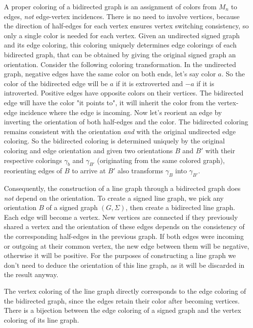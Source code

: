 A proper coloring of a bidirected graph is an assignment of colors from $M_n$ to edges, \textit{not} edge-vertex incidences. 
There is no need to involve vertices, because the direction of half-edges for each vertex ensures vertex switching consistency, so only a single color is needed for each vertex.
Given an undirected signed graph and its edge coloring, this coloring uniquely determines edge colorings of each bidirected graph, that can be obtained by giving the original signed graph an orientation.
Consider the following coloring transformation. In the undirected graph, negative edges have the same color on both ends, let's say color $a$. So the color of the bidirected edge will be $a$ if it is extroverted and $-a$ if it is introverted.
Positive edges have opposite colors on their vertices. The bidirected edge will have the color "it points to", it will inherit the color from the vertex-edge incidence where the edge is incoming.
Now let's reorient an edge by inverting the orientation of both half-edges and the color. The bidirected coloring remains consistent with the orientation \textit{and} with the original undirected edge coloring.
So the bidirected coloring is determined uniquely by the original coloring and edge orientation and given two orientations $B$ and $B'$ with their respective colorings $\gamma _b$ and $\gamma _{B'}$ (originating from the same colored graph),
reorienting edges of $B$ to arrive at $B'$ also transforms $\gamma _B$ into $\gamma _{B'}$.

Consequently, the construction of a line graph through a bidirected graph does \textit{not} depend on the orientation. To create a signed line graph,
we pick any orientation $B$ of a signed graph $(G, \Sigma)$, then create a bidirected line graph. Each edge will become a vertex.
New vertices are connected if they previously shared a vertex and the orientation of these edges depends on the consistency of the corresponding half-edges in the previous graph.
If both edges were incoming or outgoing at their common vertex, the new edge between them will be negative, otherwise it will be positive. 
For the purposes of constructing a line graph we don't need to deduce the orientation of this line graph, as it will be discarded in the result anyway.

The vertex coloring of the line graph directly corresponds to the edge coloring of the bidirected graph, since the edges retain their color after becoming vertices.
There is a bijection between the edge coloring of a signed graph and the vertex coloring of its line graph.
